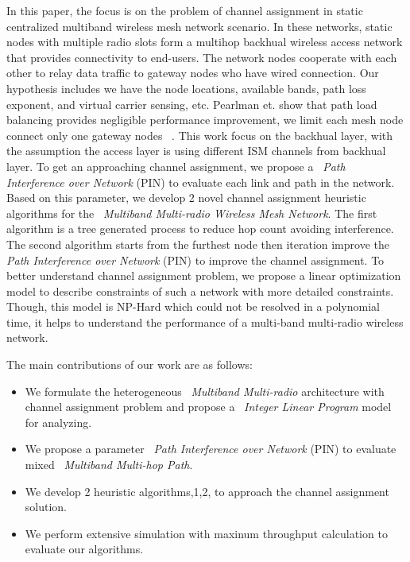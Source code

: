 In this paper, the focus is on the problem of channel assignment in static centralized multiband wireless mesh network scenario. 
In these networks, static nodes with multiple radio slots form a multihop backhual wireless access network that provides connectivity to end-users. The network nodes cooperate with each other to relay data traffic to gateway nodes who have wired connection. 
Our hypothesis includes we have the node locations, available bands, path loss exponent, and virtual carrier sensing, etc. 
Pearlman et. show that path load balancing provides negligible performance improvement, we limit each mesh node connect only one gateway nodes ~\cite{pearlman2000impact}.
This work focus on the backhual layer, with the assumption the access layer is using different ISM channels from backhual layer.
To get an approaching channel assignment, we propose a ~\emph{Path Interference over Network} (PIN) to evaluate each link and path in the network. Based on this parameter, we develop 2 novel channel assignment heuristic algorithms for the ~\emph{Multiband Multi-radio Wireless Mesh Network}. 
The first algorithm is a tree generated process to reduce hop count avoiding interference. The second algorithm starts from the furthest node then iteration improve the \emph{Path Interference over Network} (PIN) to improve the channel assignment.
To better understand channel assignment problem, we propose a linear optimization model to describe constraints of such a network with more detailed constraints. Though, this model is NP-Hard which could not be resolved in a polynomial time, it helps to understand the performance of a multi-band multi-radio wireless network. 

% 
The main contributions of our work are as follows:
\begin{itemize}
\item We formulate the heterogeneous ~\emph{Multiband Multi-radio} architecture with channel assignment problem and propose a ~\emph{Integer Linear Program} model for analyzing.  

\item We propose a  parameter ~\emph{Path Interference over Network} (PIN) to evaluate mixed ~\emph{Multiband Multi-hop Path}.

\item We develop 2 heuristic algorithms,1,2, to approach the channel assignment solution.

\item We perform extensive simulation with maxinum throughput calculation to evaluate our algorithms.


\end{itemize}

